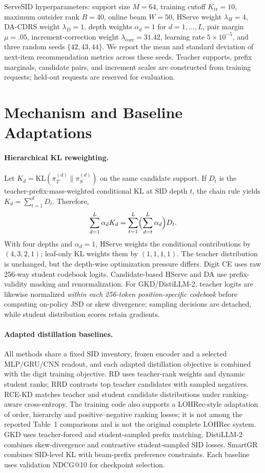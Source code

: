 \documentclass[sigconf, anonymous, review]{acmart}
\begin{document}
ServeSID hyperparameters: support size $M=64$, training cutoff
$K_{\mathrm{tr}}=10$, maximum outsider rank $B=40$, online beam
$W=50$, HServe weight $\lambda_H=4$, DA-CDRS weight $\lambda_D=1$,
depth weights $\alpha_d=1$ for $d=1,\dots,L$, pair margin $\mu=.05$,
increment-correction weight $\lambda_{\mathrm{corr}}=31.42$, learning
rate $5\times10^{-5}$, and three random seeds $\{42,43,44\}$.
We report the mean and standard deviation of next-item recommendation
metrics across these seeds. Teacher supports, prefix marginals,
candidate pairs, and increment scales are constructed from
training requests; held-out requests are reserved for evaluation.



\section{Mechanism and Baseline Adaptations}
\label{sec:sup-mechanism}

\paragraph{Hierarchical KL reweighting.}
Let $K_d=\mathrm{KL}(\pi_T^{(d)}\|\pi_S^{(d)})$ on the
same candidate support. If $D_t$ is the
teacher-prefix-mass-weighted conditional KL at SID depth $t$,
the chain rule yields $K_d=\sum_{t=1}^{d}D_t$. Therefore,
\[
\sum_{d=1}^{L}\alpha_d K_d
=\sum_{t=1}^{L}\Bigl(\sum_{d=t}^{L}\alpha_d\Bigr)D_t.
\]
With four depths and $\alpha_d=1$, HServe weights the
conditional contributions by $(4,3,2,1)$; leaf-only KL
weights them by $(1,1,1,1)$. The teacher distribution is
unchanged, but the depth-wise optimization pressure differs.
Digit CE uses raw 256-way student codebook logits. Candidate-based
HServe and DA use prefix-validity masking and renormalization.
For GKD/DistiLLM-2, teacher logits are likewise normalized
\emph{within each 256-token position-specific codebook} before
computing on-policy JSD or skew divergence; sampling decisions
are detached, while student distribution scores retain gradients.

\paragraph{Adapted distillation baselines.}
All methods share a fixed SID inventory, frozen encoder and
a selected MLP/GRU/CNN readout, and each adapted distillation
objective is combined with the digit training objective.
RD uses teacher-rank weights and dynamic student ranks;
RRD contrasts top teacher candidates with sampled negatives.
RCE-KD matches teacher and student candidate distributions
under ranking-aware cross-entropy.
The training code also supports a LOHRec-style adaptation of
order, hierarchy and positive--negative ranking losses; it is
not among the reported Table~1 comparisons and is not the
original complete LOHRec system.
GKD uses teacher-forced and student-sampled prefix matching.
DistiLLM-2 combines skew-divergence and contrastive
student-sampled SID losses. SmartGR combines SID-level KL
with beam-prefix preference constraints. Each baseline
uses validation NDCG@10 for checkpoint selection.
\end{document}
